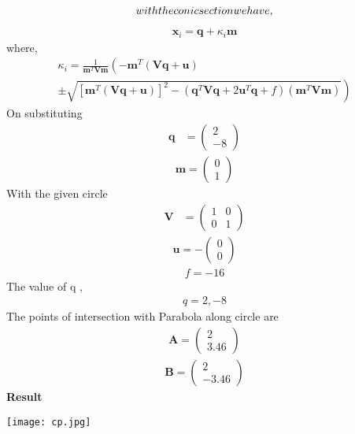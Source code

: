 \documentclass[10pt,a4paper]{report}
\newcommand{\myvec}[1]{\ensuremath{\begin{pmatrix}#1\end{pmatrix}}}
\let\vec\mathbf
\let\vec\mathbf
\providecommand{\brak}[1]{\ensuremath{\left(#1\right)}}
\providecommand{\lbrak}[1]{\ensuremath{\left(#1\right.}}
\providecommand{\rbrak}[1]{\ensuremath{\left.#1\right)}}
\providecommand{\sbrak}[1]{\ensuremath{{}\left[#1\right]}}
\begin{document}
\begin{multicols}{2}
\begin{align}
\noindent with the conic section  we have ,
\end{align}
\begin{align}
\vec{x}_i = \vec{q} + \kappa_i \vec{m}
\end{align}
where, \\
{\tiny
\begin{multline}
\kappa_i = \frac{1}
{
\vec{m}^T\vec{V}\vec{m}
}
\lbrak{-\vec{m}^T\brak{\vec{V}\vec{q}+\vec{u}}}
\\
\pm
\rbrak{\sqrt{
\sbrak{
\vec{m}^T\brak{\vec{V}\vec{q}+\vec{u}}
}^2
-
\brak
{
\vec{q}^T\vec{V}\vec{q} + 2\vec{u}^T\vec{q} +f
}
\brak{\vec{m}^T\vec{V}\vec{m}}
}
}
\end{multline}
}
On substituting\\
\begin{align}
\vec{q} &= \myvec{
2\\
-8
} 
\end{align}
\begin{align}
\vec{m} = \myvec{0 \\ 1}
\end{align}
With the given circle\\ 
\begin{align}
	\vec{V} &= \myvec{
1 & 0\\
0 & 1
    }
\end{align}
\begin{align}
	\vec{u} = -\myvec{0 \\0}
 \end{align}
 \begin{align}
  f = -16
 \end{align}
The value of q ,\\
\begin{align}
    q = 2,-8
\end{align}
The points of intersection with Parabola along circle are \\
\begin{align}
    \vec{A}=\myvec{
2\\
3.46
    }
\end{align}
\begin{align}
    \vec{B}=\myvec{
2\\
-3.46
    }
\end{align}
\textbf{Result}
\begin{center}
\begin{minipage}[b]{0.4\textwidth}
    \texttt{[image: cp.jpg]}
  \end{minipage}

\end{center}
\end{multicols}
\end{document}
